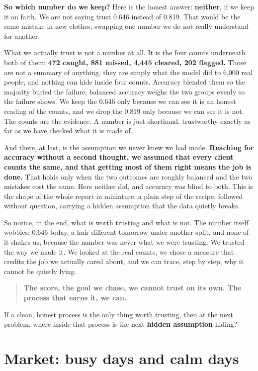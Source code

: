 \documentclass[11pt]{article} %
\begin{document}
\textbf{So which number do we keep?} Here is the honest answer: \textbf{neither}, if we keep it on faith. We are not saying trust 0.646 instead of 0.819. That would be the same mistake in new clothes, swapping one number we do not really understand for another.

What we actually trust is not a number at all. It is the four counts underneath both of them: \textbf{472 caught, 881 missed, 4,445 cleared, 202 flagged.} Those are not a summary of anything, they are simply what the model did to 6,000 real people, and nothing can hide inside four counts. Accuracy blended them so the majority buried the failure; balanced accuracy weighs the two groups evenly so the failure shows. We keep the 0.646 only because we can see it is an honest reading of the counts, and we drop the 0.819 only because we can see it is not. The counts are the evidence. A number is just shorthand, trustworthy exactly as far as we have checked what it is made of.

And there, at last, is the assumption we never knew we had made. \textbf{Reaching for accuracy without a second thought, we assumed that every client counts the same, and that getting most of them right means the job is done.} That holds only when the two outcomes are roughly balanced and the two mistakes cost the same. Here neither did, and accuracy was blind to both. This is the shape of the whole report in miniature: a plain step of the recipe, followed without question, carrying a hidden assumption that the data quietly breaks.

So notice, in the end, what is worth trusting and what is not. The number itself wobbles: 0.646 today, a hair different tomorrow under another split, and none of it shakes us, because the number was never what we were trusting. We trusted the way we made it. We looked at the real counts, we chose a measure that credits the job we actually cared about, and we can trace, step by step, why it cannot be quietly lying. 


\begin{quote}
\textbf{The score, the goal we chase, we cannot trust on its own. The process that earns it, we can.}
\end{quote}


If a clean, honest process is the only thing worth trusting, then at the next problem, where inside that process is the next \textbf{hidden assumption} hiding?


\section{Market: busy days and calm days}
\end{document}

